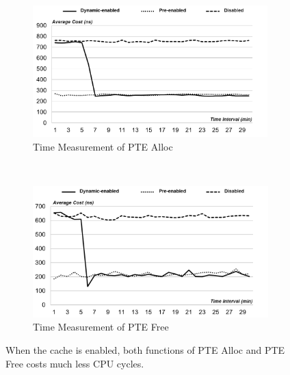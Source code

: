 \begin{figure}[t!]
    \centering
    \begin{subfigure}[t]{0.5\textwidth}
        \centering
        \includegraphics[height=2.0in]{image/micro/PTEalloc.png}
        \caption{Time Measurement of PTE Alloc}
        \label{fig:subfig:a}
    \end{subfigure}%
    ~
    \begin{subfigure}[t]{0.5\textwidth}
        \centering
        \includegraphics[height=2.0in]{image/micro/PTEfree.png}
        \caption{Time Measurement of PTE Free}
        \label{fig:subfig:b}
    \end{subfigure}
    \caption{When the cache is enabled, both functions of PTE Alloc and PTE Free costs much less CPU cycles.}
    \label{fig:PTEtime}
\end{figure}


